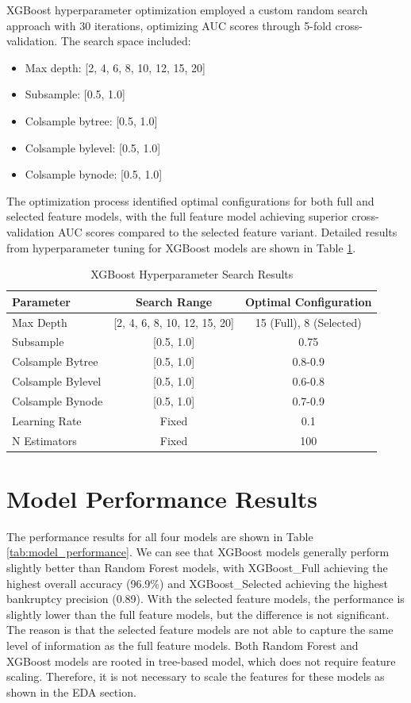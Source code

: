 XGBoost hyperparameter optimization employed a custom random search approach with 30 iterations, optimizing AUC scores through 5-fold cross-validation. The search space included:

\begin{itemize}
    \item Max depth: [2, 4, 6, 8, 10, 12, 15, 20]
    \item Subsample: [0.5, 1.0]
    \item Colsample bytree: [0.5, 1.0]
    \item Colsample bylevel: [0.5, 1.0]
    \item Colsample bynode: [0.5, 1.0]
\end{itemize}

The optimization process identified optimal configurations for both full and selected feature models, with the full feature model achieving superior cross-validation AUC scores compared to the selected feature variant.
Detailed results from hyperparameter tuning for XGBoost models are shown in Table \ref{tab:xgb_hyperparams}.

\begin{table}[H]
    \centering
    \caption{XGBoost Hyperparameter Search Results}
    \label{tab:xgb_hyperparams}
    \begin{tabular}{lcc}
    \toprule
    \textbf{Parameter} & \textbf{Search Range} & \textbf{Optimal Configuration} \\
    \midrule
    Max Depth & [2, 4, 6, 8, 10, 12, 15, 20] & 15 (Full), 8 (Selected) \\
    Subsample & [0.5, 1.0] & 0.75 \\
    Colsample Bytree & [0.5, 1.0] & 0.8-0.9 \\
    Colsample Bylevel & [0.5, 1.0] & 0.6-0.8 \\
    Colsample Bynode & [0.5, 1.0] & 0.7-0.9 \\
    Learning Rate & Fixed & 0.1 \\
    N Estimators & Fixed & 100 \\
    \bottomrule
    \end{tabular}
\end{table}

\section*{Model Performance Results}

The performance results for all four models are shown in Table \ref{tab:model_performance}.
We can see that XGBoost models generally perform slightly better than Random Forest models, with XGBoost\_Full achieving the highest overall accuracy (96.9\%) and XGBoost\_Selected achieving the highest bankruptcy precision (0.89).
With the selected feature models, the performance is slightly lower than the full feature models, but the difference is not significant. 
The reason is that the selected feature models are not able to capture the same level of information as the full feature models.
Both Random Forest and XGBoost models are rooted in tree-based model, which does not require feature scaling. Therefore, it is not necessary to scale the features for these models as shown in the EDA section.

